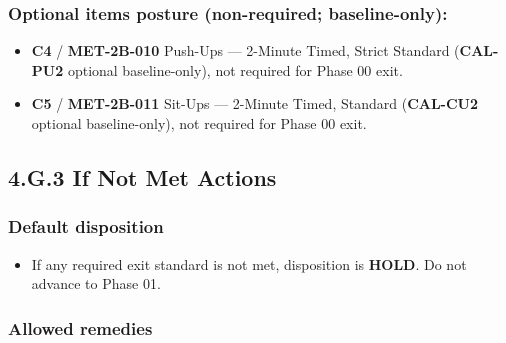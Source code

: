 \documentclass[10pt]{article}
\begin{document}
\begin{landscape}
\endgroup

\subsubsection*{Optional items posture (non-required; baseline-only):}

\begin{itemize}
\item \textbf{C4} / \textbf{MET-2B-010} Push-Ups — 2-Minute Timed, Strict Standard (\textbf{CAL-PU2} optional baseline-only), not required for Phase 00 exit.
\item \textbf{C5} / \textbf{MET-2B-011} Sit-Ups — 2-Minute Timed, Standard (\textbf{CAL-CU2} optional baseline-only), not required for Phase 00 exit.
\end{itemize}

\end{landscape}
\clearpage

\subsection*{4.G.3 If Not Met Actions}
{}

\subsubsection*{Default disposition}

\begin{itemize}
\item If any required exit standard is not met, disposition is \textbf{HOLD}. Do not advance to Phase 01.
\end{itemize}

\subsubsection*{Allowed remedies}
\end{document}
